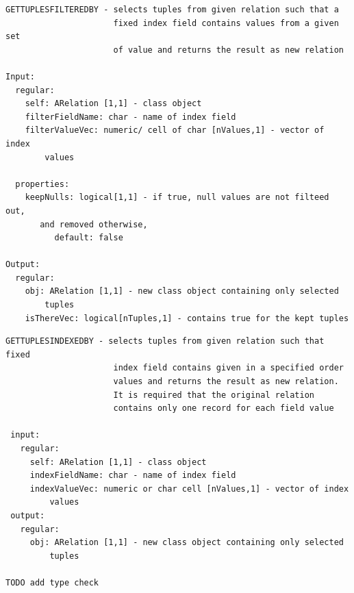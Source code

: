 \documentclass[letterpaper,10pt,english]{sphinxmanual}
\begin{document}
\label{chap_func:smartdb-relations-atypifiedstaticrelation-gettuplesfilteredby}
\begin{Verbatim}[commandchars=\\\{\}]
GETTUPLESFILTEREDBY - selects tuples from given relation such that a
                      fixed index field contains values from a given set
                      of value and returns the result as new relation

Input:
  regular:
    self: ARelation [1,1] - class object
    filterFieldName: char - name of index field
    filterValueVec: numeric/ cell of char [nValues,1] - vector of index
        values

  properties:
    keepNulls: logical[1,1] - if true, null values are not filteed out,
       and removed otherwise,
          default: false

Output:
  regular:
    obj: ARelation [1,1] - new class object containing only selected
        tuples
    isThereVec: logical[nTuples,1] - contains true for the kept tuples
\end{Verbatim}
\label{chap_func:smartdb-relations-atypifiedstaticrelation-gettuplesindexedby}
\begin{Verbatim}[commandchars=\\\{\}]
 GETTUPLESINDEXEDBY - selects tuples from given relation such that fixed
                      index field contains given in a specified order
                      values and returns the result as new relation.
                      It is required that the original relation
                      contains only one record for each field value

 input:
   regular:
     self: ARelation [1,1] - class object
     indexFieldName: char - name of index field
     indexValueVec: numeric or char cell [nValues,1] - vector of index
         values
 output:
   regular:
     obj: ARelation [1,1] - new class object containing only selected
         tuples

TODO add type check
\end{Verbatim}
\label{chap_func:smartdb-relations-atypifiedstaticrelation-gettuplesjoinedwith}
\end{document}
